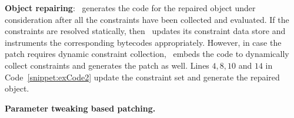 \begin{mylist}

 \item \textbf{Object repairing}: \tool\ generates the code for the repaired
object under consideration after all the constraints have been collected and
evaluated. If the constraints are resolved statically, then \tool\ updates its
constraint data store and instruments the corresponding bytecodes appropriately.
However, in case the patch requires dynamic constraint collection, \tool\ embeds
the code to dynamically collect constraints and generates the patch as well.
Lines $4, 8, 10$ and $14$ in Code~\ref{snippet:exCode2} update the constraint
set and generate the repaired object.

\begin{algorithm}[t]
\scriptsize
\DontPrintSemicolon
{}
\caption{\bf Parameter tweaking based  patching.}
\label{algo:stringPatchParametr}
\end{algorithm}


\end{mylist}
